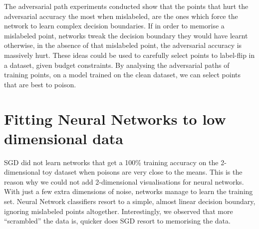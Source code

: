 \documentclass{ociamthesis}
\begin{document}
The adversarial path experiments conducted show that the points that hurt the
adversarial accuracy the most when mislabeled, are the ones which force the
network to learn complex decision boundaries. If in order to memorise a
mislabeled point, networks tweak the decision boundary they would have learnt
otherwise, in the absence of that mislabeled point, the adversarial accuracy is
massively hurt. These ideas could be used to carefully select points to
label-flip in a dataset, given budget constraints. By analysing the adversarial
paths of training points, on a model trained on the clean dataset, we can select
points that are best to poison.


\clearpage



\begin{appendices}
    
\end{appendices}
\section{Fitting Neural Networks to low dimensional data}

SGD did not learn networks that get a 100\% training accuracy on the
2-dimensional toy dataset when poisons are very close to the means. This is the
reason why we could not add 2-dimensional visualisations for neural networks.
With just a few extra dimensions of noise, networks manage to learn the training
set. Neural Network classifiers resort to a simple, almost linear decision
boundary, ignoring mislabeled points altogether. Interestingly, we observed that
more ``scrambled'' the data is, quicker does SGD resort to memorising the data.
\end{document}
